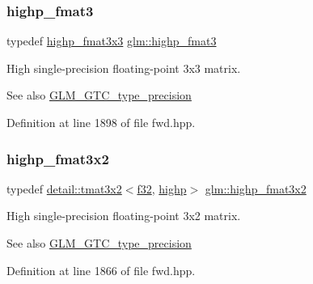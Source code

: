 \subsubsection{\texorpdfstring{highp\+\_\+fmat3}{highp\_fmat3}}
{\footnotesize\ttfamily typedef \hyperlink{group__gtc__type__precision_gaf1d697243b1de74a5769c49e68b1e2a6}{highp\+\_\+fmat3x3} \hyperlink{group__gtc__type__precision_ga3ff9af2eba26aa6df92aa73e1083e81e}{glm\+::highp\+\_\+fmat3}}

High single-\/precision floating-\/point 3x3 matrix. \begin{DoxySeeAlso}{See also}
\hyperlink{group__gtc__type__precision}{G\+L\+M\+\_\+\+G\+T\+C\+\_\+type\+\_\+precision} 
\end{DoxySeeAlso}


Definition at line 1898 of file fwd.\+hpp.

\mbox{\label{group__gtc__type__precision_gad5c083691eb15539fd81e27e1dc6b813}} 
\subsubsection{\texorpdfstring{highp\+\_\+fmat3x2}{highp\_fmat3x2}}
{\footnotesize\ttfamily typedef \hyperlink{structglm_1_1detail_1_1tmat3x2}{detail\+::tmat3x2}$<$\hyperlink{group__gtc__type__precision_ga0ec999b57f5330d9021256e96038df04}{f32}, \hyperlink{namespaceglm_a0f04f086094c747d227af4425893f545ac6f7eab42eacbb10d59a58e95e362074}{highp}$>$ \hyperlink{group__gtc__type__precision_gad5c083691eb15539fd81e27e1dc6b813}{glm\+::highp\+\_\+fmat3x2}}

High single-\/precision floating-\/point 3x2 matrix. \begin{DoxySeeAlso}{See also}
\hyperlink{group__gtc__type__precision}{G\+L\+M\+\_\+\+G\+T\+C\+\_\+type\+\_\+precision} 
\end{DoxySeeAlso}


Definition at line 1866 of file fwd.\+hpp.

\mbox{\label{group__gtc__type__precision_gaf1d697243b1de74a5769c49e68b1e2a6}} 
